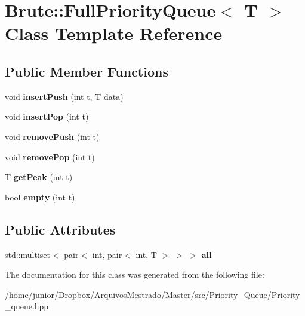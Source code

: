 \hypertarget{classBrute_1_1FullPriorityQueue}{}\section{Brute\+:\+:Full\+Priority\+Queue$<$ T $>$ Class Template Reference}
\label{classBrute_1_1FullPriorityQueue}
\subsection*{Public Member Functions}
\begin{DoxyCompactItemize}
\item 
\mbox{\label{classBrute_1_1FullPriorityQueue_ac4a7840f16b0fff5ca90920f3646a504}} 
void {\bfseries insert\+Push} (int t, T data)
\item 
\mbox{\label{classBrute_1_1FullPriorityQueue_a0dbc488046321d9ef58c7b124d9f71a7}} 
void {\bfseries insert\+Pop} (int t)
\item 
\mbox{\label{classBrute_1_1FullPriorityQueue_a3faa79fc9fad31f2572d80df3beea392}} 
void {\bfseries remove\+Push} (int t)
\item 
\mbox{\label{classBrute_1_1FullPriorityQueue_a4310a7e462f8ef3a6e2078e695a384b2}} 
void {\bfseries remove\+Pop} (int t)
\item 
\mbox{\label{classBrute_1_1FullPriorityQueue_a696b62029dba8ba7571a124c64ba94ef}} 
T {\bfseries get\+Peak} (int t)
\item 
\mbox{\label{classBrute_1_1FullPriorityQueue_a572c0b02ac94766f83b79ca41ef00d81}} 
bool {\bfseries empty} (int t)
\end{DoxyCompactItemize}
\subsection*{Public Attributes}
\begin{DoxyCompactItemize}
\item 
\mbox{\label{classBrute_1_1FullPriorityQueue_a71b4544a5173c8a2c2e549d8d5f34d28}} 
std\+::multiset$<$ pair$<$ int, pair$<$ int, T $>$ $>$ $>$ {\bfseries all}
\end{DoxyCompactItemize}


The documentation for this class was generated from the following file\+:\begin{DoxyCompactItemize}
\item 
/home/junior/\+Dropbox/\+Arquivos\+Mestrado/\+Master/src/\+Priority\+\_\+\+Queue/Priority\+\_\+queue.\+hpp\end{DoxyCompactItemize}
